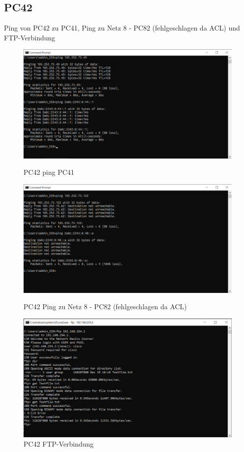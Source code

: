 \documentclass{article}
\begin{document}
\subsection{PC42}
Ping von PC42 zu PC41, Ping zu Netz 8 - PC82 (fehlgeschlagen da ACL) und FTP-Verbindung\\
\begin{figure}[!htp]
  \centering
  \begin{minipage}[b]{0.25\textwidth}
    \includegraphics[width=\textwidth]{Arbeitsergebnisse/PC42/pc42_ping_PC41.png}
    \caption{PC42 ping PC41}
  \end{minipage}
  \hspace{0.8cm}
  \begin{minipage}[b]{0.25\textwidth}
    \includegraphics[width=\textwidth]{Arbeitsergebnisse/PC42/pc42_ping_failed.png}
    \caption{PC42 Ping zu Netz 8 - PC82 (fehlgeschlagen da ACL)}
  \end{minipage}
  \hspace{0.8cm}
  \begin{minipage}[b]{0.25\textwidth}
    \includegraphics[width=\textwidth]{Arbeitsergebnisse/PC42/pc42_ftp.png}
    \caption{PC42 FTP-Verbindung}
  \end{minipage}
\end{figure}
\end{document}
